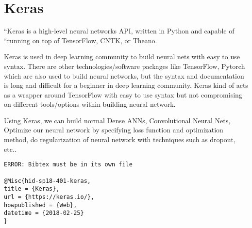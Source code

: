 \section{Keras} 

``Keras is a high-level neural networks API, written in Python and capable of
``running on top of TensorFlow, CNTK, or Theano.~\cite{hid-sp18-401-keras}

Keras is used in deep learning community to build neural nets with easy to use
syntax. There are other technologies/software packages like TensorFlow, Pytorch
which are also used to build neural networks, but the syntax and documentation
is long and difficult for a beginner in deep learning community. Keras kind of
acts as a wrapper around TensorFlow with easy to use syntax but not compromising
on different tools/options within building neural network.

Using Keras, we can build normal Dense ANNs, Convolutional Neural Nets, Optimize
our neural network by specifying loss function and optimization method, do
regularization of neural network with techniques such as dropout, etc..

\begin{verbatim}
ERROR: Bibtex must be in its own file

@Misc{hid-sp18-401-keras,
title = {Keras},
url = {https://keras.io/},
howpublished = {Web},
datetime = {2018-02-25}
}
\end{verbatim}